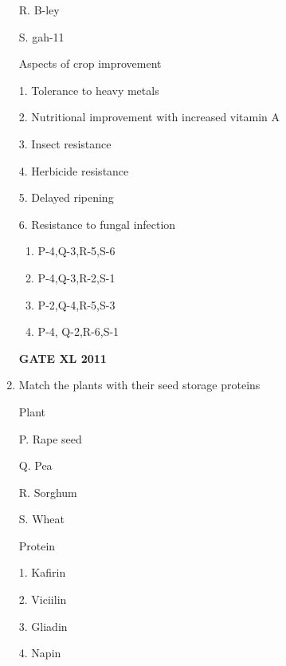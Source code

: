 \documentclass[journal,12pt,onecolumn]{IEEEtran}
\begin{document}
\begin{enumerate}
\begin{minipage}{0.5\textwidth}
\begin{flushleft}
R. B-ley

S. gah-11

		\end{flushleft}
		\end{minipage}
	\begin{minipage}{0.5\textwidth}
		\begin{flushleft}


Aspects of crop improvement

1. Tolerance to heavy metals

2. Nutritional improvement with increased vitamin A

3. Insect resistance

4. Herbicide resistance

5. Delayed ripening

6. Resistance to fungal infection

		\end{flushleft}
		\end{minipage}

		\begin{enumerate}
			\item P-4,Q-3,R-5,S-6
			\item P-4,Q-3,R-2,S-1
			\item P-2,Q-4,R-5,S-3
			\item P-4, Q-2,R-6,S-1
		\end{enumerate}
		\hfill{\textbf{GATE XL 2011}}

\item {Match the plants with their seed storage proteins}


\begin{minipage}{0.5\textwidth}
	\begin{flushleft}


Plant

P. Rape seed

Q. Pea

R. Sorghum

S. Wheat

		\end{flushleft}
		\end{minipage}
	\begin{minipage}{0.5\textwidth}
		\begin{flushleft}

Protein

1. Kafirin

2. Viciilin

3. Gliadin

4. Napin


\end{flushleft}
\end{minipage}
\end{enumerate}
\end{document}
